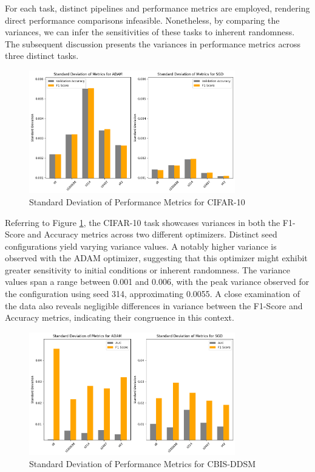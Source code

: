 For each task, distinct pipelines and performance metrics are employed, rendering direct performance comparisons infeasible. Nonetheless, by comparing the variances, we can infer the sensitivities of these tasks to inherent randomness. The subsequent discussion presents the variances in performance metrics across three distinct tasks.

\begin{figure}[h!]
      \centering
      \includegraphics[width=0.8\textwidth]{figures/cifar_std_results.png}
      \caption{Standard Deviation of Performance Metrics for CIFAR-10}
      \label{fig:cifar10_var}
\end{figure}

Referring to Figure \ref{fig:cifar10_var}, the CIFAR-10 task showcases variances in both the F1-Score and Accuracy metrics across two different optimizers. Distinct seed configurations yield varying variance values. A notably higher variance is observed with the ADAM optimizer, suggesting that this optimizer might exhibit greater sensitivity to initial conditions or inherent randomness. The variance values span a range between 0.001 and 0.006, with the peak variance observed for the configuration using seed 314, approximating 0.0055. A close examination of the data also reveals negligible differences in variance between the F1-Score and Accuracy metrics, indicating their congruence in this context.\\


\begin{figure}[h!]
  \centering
  \includegraphics[width=0.8\textwidth]{figures/mammo_results_std.png}
  \caption{Standard Deviation of Performance Metrics for CBIS-DDSM}
  \label{fig:cbisddsm_var}
\end{figure}

